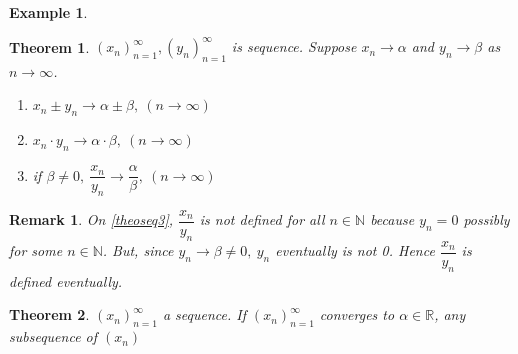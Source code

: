 \documentclass[a4paper,10pt]{article}
\newtheorem{remark}{Remark}[]
\newtheorem{theo}{Theorem}[]
\newtheorem{ex}{Example}[]
\begin{document}
\begin{ex}
	
\end{ex}

\begin{theo}
	$ (x_{n})_{n=1}^{\infty} , (y_{n})_{n=1}^{\infty} $ is sequence. Suppose $ x_{n} \rightarrow \alpha $ and $ y_{n} \rightarrow \beta $ as $ n\rightarrow \infty $.
	\begin{enumerate}
		\item $ x_{n} \pm y_{n} \rightarrow \alpha \pm \beta , \ (n \rightarrow \infty) $
		\item $ x_{n} \cdot y_{n} \rightarrow \alpha \cdot \beta , \ (n \rightarrow \infty) $
		\item \label{theoseq3} if $ \beta \neq 0, \ \dfrac{x_{n}}{y_{n}} \rightarrow \dfrac{\alpha}{\beta} , \ (n \rightarrow \infty) $
	\end{enumerate}
\end{theo}

\begin{remark}
	On \ref{theoseq3}, $ \dfrac{x_{n}}{y_{n}} $ is not defined for all $ n \in \mathbb{N} $ because $ y_{n}=0 $ possibly for some $ n \in \mathbb{N} $. But, since $ y_{n} \rightarrow \beta \neq 0, \ y_{n} $ eventually is not 0. Hence $ \dfrac{x_{n}}{y_{n}} $ is defined eventually.
\end{remark}

\begin{theo}
	$ (x_{n})_{n=1}^{\infty} $ a sequence. If $ (x_{n})_{n=1}^{\infty} $ converges to $ \alpha \in \mathbb{R} $, any subsequence of $ (x_{n}) $
\end{theo}
\end{document}
